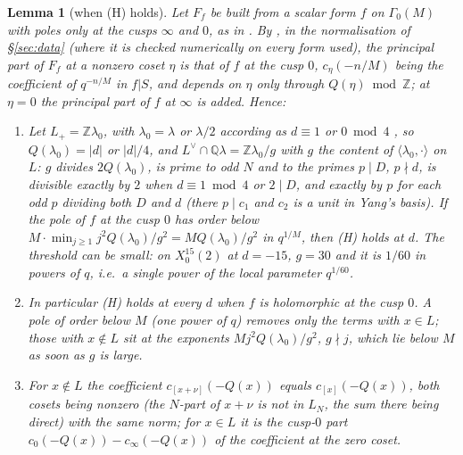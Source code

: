 \documentclass[11pt,reqno]{amsart}
\theoremstyle{plain}
\newtheorem{lemma}[theorem]{Lemma}
\theoremstyle{definition}
\newcommand{\Q}{\mathbb{Q}}
\newcommand{\Z}{\mathbb{Z}}
\newcommand{\Ldual}{L^{\vee}}
\newcommand{\Lp}{L_{+}}
\begin{document}
\begin{lemma}[when (H) holds]\label{lem:H}
Let $F_f$ be built from a scalar form $f$ on $\Gamma_0(M)$ with poles only at the cusps $\infty$
and $0$, as in \cite[(6)]{GY}. By \cite[Lemma~24]{GY}, in the normalisation of \S\ref{sec:data}
(where it is checked numerically on every form used), the principal part of $F_f$ at a nonzero
coset $\eta$ is that of $f$ at the cusp $0$, $c_\eta(-n/M)$ being the coefficient of $q^{-n/M}$ in
$f|S$, and depends on $\eta$ only through $Q(\eta)\bmod\Z$; at $\eta=0$ the principal part of $f$
at $\infty$ is added. Hence:
\begin{enumerate}
\item Let $\Lp=\Z\lambda_0$, with $\lambda_0=\lambda$ or $\lambda/2$ according as $d\equiv1$ or
      $0\bmod4$ \cite[proof of Lemma~18]{Yang}, so $Q(\lambda_0)=\lvert d\rvert$ or
      $\lvert d\rvert/4$, and $\Ldual\cap\Q\lambda=\Z\lambda_0/g$ with $g$ the content of
      $\langle\lambda_0,\cdot\rangle$ on $L$: $g$ divides $2Q(\lambda_0)$, is prime to odd $N$ and
      to the primes $p\mid D$, $p\nmid d$, is divisible exactly by $2$ when $d\equiv1\bmod4$ or
      $2\mid D$, and exactly by $p$ for each odd $p$ dividing both $D$ and $d$ (there $p\mid c_1$
      and $c_2$ is a unit in Yang's basis). If the pole of $f$ at the cusp $0$ has order below
      $M\cdot\min_{j\ge1}j^2Q(\lambda_0)/g^2=MQ(\lambda_0)/g^2$ in $q^{1/M}$, then (H) holds at
      $d$. The threshold can be small: on $X_0^{15}(2)$ at $d=-15$, $g=30$ and it is $1/60$ in
      powers of $q$, i.e.\ a single power of the local parameter $q^{1/60}$.
\item In particular (H) holds at every $d$ when $f$ is holomorphic at the cusp $0$. A pole of
      order below $M$ (one power of $q$) removes only the terms with $x\in L$; those with
      $x\notin L$ sit at the exponents $Mj^2Q(\lambda_0)/g^2$, $g\nmid j$, which lie below $M$ as
      soon as $g$ is large.
\item For $x\notin L$ the coefficient $c_{[x+\nu]}(-Q(x))$ equals $c_{[x]}(-Q(x))$, both cosets
      being nonzero (the $N$-part of $x+\nu$ is not in $L_N$, the sum there being direct) with
      the same norm; for $x\in L$ it is the cusp-$0$ part $c_0(-Q(x))-c_\infty(-Q(x))$ of the
      coefficient at the zero coset.
\end{enumerate}
\end{lemma}
\end{document}
